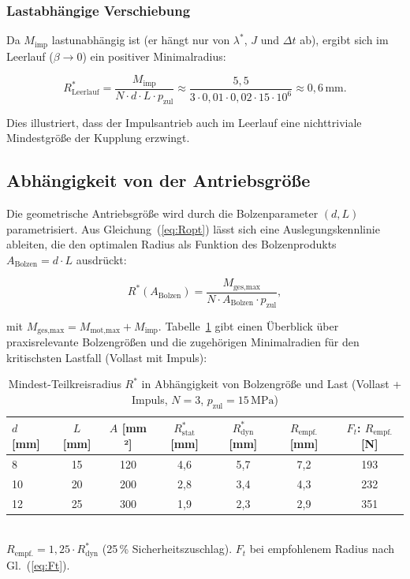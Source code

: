 ﻿\documentclass[a4paper,12pt]{article}
\begin{document}
\subsubsection*{Lastabhängige Verschiebung}

Da $M_\text{imp}$ lastunabhängig ist (er hängt nur von $\lambda^*$, $J$ und
$\Delta t$ ab), ergibt sich im Leerlauf ($\beta \to 0$) ein positiver
Minimalradius:

\begin{equation}
  R^*_\text{Leerlauf} = \frac{M_\text{imp}}{N \cdot d \cdot L \cdot p_\text{zul}}
    \approx \frac{5{,}5}{3 \cdot 0{,}01 \cdot 0{,}02 \cdot 15 \cdot 10^6}
    \approx 0{,}6\,\text{mm}.
  \label{eq:Ropt_leerlauf}
\end{equation}

Dies illustriert, dass der Impulsantrieb auch im Leerlauf eine nichttriviale
Mindestgröße der Kupplung erzwingt.

\subsection{Abhängigkeit von der Antriebsgröße}

Die geometrische Antriebsgröße wird durch die Bolzenparameter $(d, L)$
parametrisiert. Aus Gleichung~(\ref{eq:Ropt}) lässt sich eine
Auslegungskennlinie ableiten, die den optimalen Radius als Funktion des
Bolzenprodukts $A_\text{Bolzen} = d \cdot L$ ausdrückt:

\begin{equation}
  R^*(A_\text{Bolzen}) =
    \frac{M_\text{ges,max}}{N \cdot A_\text{Bolzen} \cdot p_\text{zul}},
  \label{eq:Ropt_Abolzen}
\end{equation}

\noindent
mit $M_\text{ges,max} = M_\text{mot,max} + M_\text{imp}$. Tabelle~\ref{tab:kupplung}
gibt einen Überblick über praxisrelevante Bolzengrößen und die zugehörigen
Minimalradien für den kritischsten Lastfall (Vollast mit Impuls):

\begin{table}[h]
\centering
\caption{Mindest-Teilkreisradius $R^*$ in Abhängigkeit von Bolzengröße und Last
(Vollast + Impuls, $N=3$, $p_\text{zul}=15\,\text{MPa}$)}
\label{tab:kupplung}
\begin{tabular}{lcccccc}
\toprule
$d$ [mm] & $L$ [mm] & $A$ [mm ²] & $R^*_\text{stat}$ [mm] & $R^*_\text{dyn}$ [mm]
         & $R_\text{empf.}$ [mm] & $F_t$:  $R_\text{empf.}$ [N] \\
\midrule
8  & 15 & 120 & 4{,}6 & 5{,}7 & 7{,}2 & 193 \\
10 & 20 & 200 & 2{,}8 & 3{,}4 & 4{,}3 & 232 \\
12 & 25 & 300 & 1{,}9 & 2{,}3 & 2{,}9 & 351 \\
\bottomrule
\end{tabular}
\\[0.5em]
\small $R_\text{empf.} = 1{,}25 \cdot R^*_\text{dyn}$ (25\,\% Sicherheitszuschlag).
$F_t$ bei empfohlenem Radius nach Gl.~(\ref{eq:Ft}).
\end{table}
\end{document}
